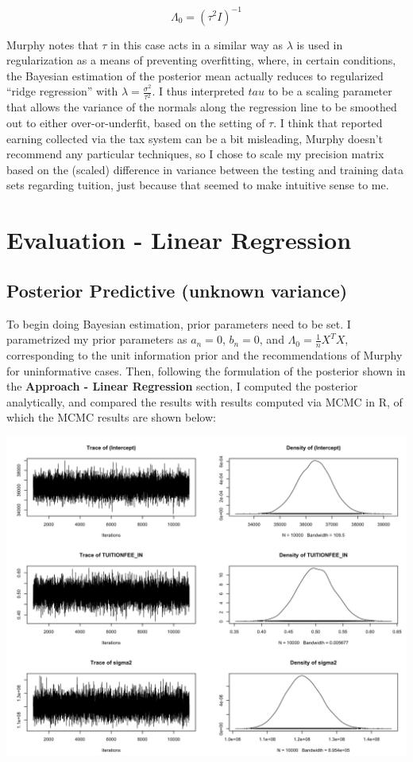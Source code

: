 \documentclass[10pt]{article}
\begin{document}
$$ \Lambda_0 = (\tau^2 I)^{-1} $$

Murphy notes that $\tau$ in this case acts in a similar way as $\lambda$ is used in regularization as a means of preventing overfitting, where, in certain conditions, the Bayesian estimation of the posterior mean actually reduces to regularized ``ridge regression'' with $\lambda = \frac{\sigma^2}{\tau^2}$. I thus interpreted $tau$ to be a scaling parameter that allows the variance of the normals along the regression line to be smoothed out to either over-or-underfit, based on the setting of $\tau$. I think that reported earning collected via the tax system can be a bit misleading, Murphy doesn't recommend any particular techniques, so I chose to scale my precision matrix based on the (scaled) difference in variance between the testing and training data sets regarding tuition, just because that seemed to make intuitive sense to me. 

\section{Evaluation - Linear Regression}
\subsection{Posterior Predictive (unknown variance)}

To begin doing Bayesian estimation, prior parameters need to be set. I parametrized my prior parameters as $a_n = 0$, $b_n = 0$, and $\Lambda_0 = \frac{1}{n} X^T X$, corresponding to the unit information prior \cite{kass1995reference} and the recommendations of Murphy \cite{murphy2012machine} for uninformative cases. Then, following the formulation of the posterior shown in the {\bf Approach - Linear Regression} section, I computed the posterior analytically, and compared the results with results computed via MCMC in R, of which the MCMC results are shown below:

\includegraphics[width=\textwidth]{figures/mcmc2}
\end{document}
